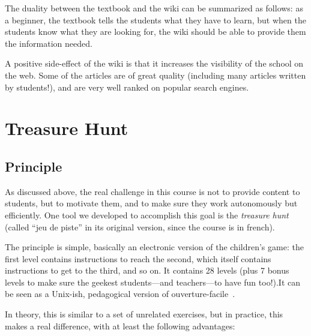 \documentclass{sig-alternate}
\begin{document}
The duality between the textbook and the wiki can be summarized as
follows: as a beginner, the textbook tells the students what they have
to learn, but when the students know what they are looking for, the
wiki should be able to provide them the information needed.

A positive side-effect of the wiki is that it increases the visibility
of the school on the web. Some of the articles are of great quality
(including many articles written by students!), and are very well
ranked on popular search engines.

\section{Treasure Hunt}
\label{sec=treasure-hunt}

\subsection{Principle}

As discussed above, the real challenge in this course is not to
provide content to students, but to motivate them, and to make sure
they work autonomously but efficiently. One tool we developed to
accomplish this goal is the \emph{treasure hunt} (called ``jeu de
piste'' in its original version, since the course is in french).

The principle is simple, basically an electronic version of the
children's game: the first level contains instructions to reach the
second, which itself contains instructions to get to the third, and so
on. It contains 28 levels (plus 7 bonus levels to make sure the
geekest students---and teachers---to have fun too!).It can be seen as a Unix-ish, pedagogical version of
ouverture-facile~\cite{ouverture-facile}.

In theory, this is similar to a set of unrelated exercises, but in
practice, this makes a real difference, with at least the following
advantages:
\end{document}
